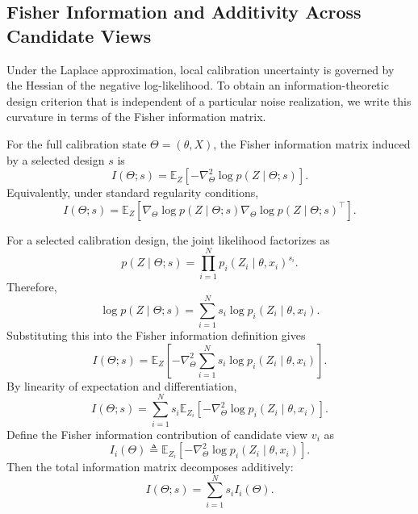 \documentclass[letterpaper, 9
 pt, conference]{ieeeconf}
\begin{document}
\subsection{Fisher Information and Additivity Across Candidate Views}
\label{subsec:fisher_information}

Under the Laplace approximation, local calibration uncertainty is governed by the Hessian of the negative log-likelihood. To obtain an information-theoretic design criterion that is independent of a particular noise realization, we write this curvature in terms of the Fisher information matrix.

For the full calibration state $\Theta=(\theta,X)$, the Fisher information matrix induced by a selected design $s$ is
\begin{equation}
    I(\Theta;s)
    =
    \mathbb{E}_{Z}
    \left[
    -
    \nabla_{\Theta}^{2}
    \log p(Z\mid \Theta;s)
    \right].
\end{equation}
Equivalently, under standard regularity conditions,
\begin{equation}
    I(\Theta;s)
    =
    \mathbb{E}_{Z}
    \left[
    \nabla_{\Theta}\log p(Z\mid \Theta;s)
    \nabla_{\Theta}\log p(Z\mid \Theta;s)^\top
    \right].
\end{equation}

For a selected calibration design, the joint likelihood factorizes as
\begin{equation}
    p(Z\mid \Theta;s)
    =
    \prod_{i=1}^{N}
    p_i(Z_i\mid \theta,x_i)^{s_i}.
\end{equation}
Therefore,
\begin{equation}
    \log p(Z\mid \Theta;s)
    =
    \sum_{i=1}^{N}
    s_i
    \log p_i(Z_i\mid \theta,x_i).
\end{equation}
Substituting this into the Fisher information definition gives
\begin{equation}
    I(\Theta;s)
    =
    \mathbb{E}_{Z}
    \left[
    -
    \nabla_{\Theta}^{2}
    \sum_{i=1}^{N}
    s_i
    \log p_i(Z_i\mid \theta,x_i)
    \right].
\end{equation}
By linearity of expectation and differentiation,
\begin{equation}
    I(\Theta;s)
    =
    \sum_{i=1}^{N}
    s_i
    \mathbb{E}_{Z_i}
    \left[
    -
    \nabla_{\Theta}^{2}
    \log p_i(Z_i\mid \theta,x_i)
    \right].
\end{equation}
Define the Fisher information contribution of candidate view $v_i$ as
\begin{equation}
    I_i(\Theta)
    \triangleq
    \mathbb{E}_{Z_i}
    \left[
    -
    \nabla_{\Theta}^{2}
    \log p_i(Z_i\mid \theta,x_i)
    \right].
\end{equation}
Then the total information matrix decomposes additively:
\begin{equation}
    I(\Theta;s)
    =
    \sum_{i=1}^{N}
    s_i I_i(\Theta).
\end{equation}
\end{document}

